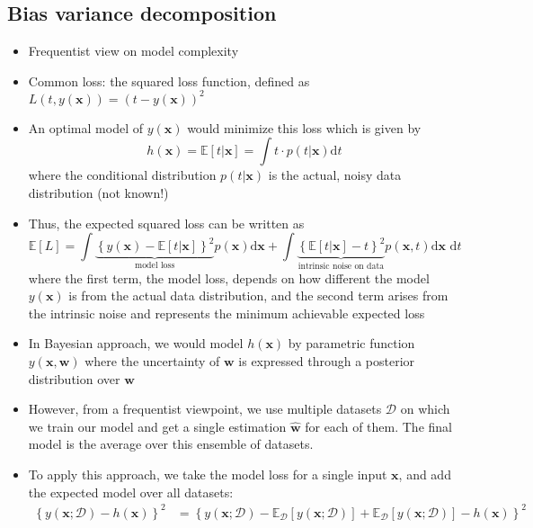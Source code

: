 \subsection{Bias variance decomposition}
\begin{itemize}
	\item Frequentist view on model complexity
	\item Common loss: the squared loss function, defined as $L\left(t, y\left(\bm{x}\right)\right) = \left(t - y\left(\bm{x}\right)\right)^2$
	\item An optimal model of $y\left(\bm{x}\right)$ would minimize this loss which is given by $$h(\bm{x}) = \mathbb{E}\left[t|\bm{x}\right] = \int t\cdot p\left(t|\bm{x}\right) \text{d}t$$
	where the conditional distribution $p\left(t|\bm{x}\right)$ is the actual, noisy data distribution (not known!)
	\item Thus, the expected squared loss can be written as
	$$\mathbb{E}\left[L\right] = \int\underbrace{\left\{y(\bm{x}) - \mathbb{E}\left[t|\bm{x}\right]\right\}^2}_{\text{model loss}} p(\bm{x}) \text{d}\bm{x} + \int\underbrace{\left\{\mathbb{E}\left[t|\bm{x}\right] - t\right\}^2}_{\text{intrinsic noise on data}} p(\bm{x},t) \text{d}\bm{x}\text{ d}t$$
	where the first term, the model loss, depends on how different the model $y(\bm{x})$ is from the actual data distribution, and the second term arises from the intrinsic noise and represents the minimum achievable expected loss
	\item In Bayesian approach, we would model $h(\bm{x})$ by parametric function $y(\bm{x}, \bm{w})$ where the uncertainty of $\bm{w}$ is expressed through a posterior distribution over $\bm{w}$
	\item However, from a frequentist viewpoint, we use multiple datasets $\mathcal{D}$ on which we train our model and get a single estimation $\bm{\hat{w}}$ for each of them. The final model is the average over this ensemble of datasets.
	\item To apply this approach, we take the model loss for a single input $\bm{x}$, and add the expected model over all datasets:
	\begin{equation*}
		\begin{split}
			\left\{y\left(\bm{x};\mathcal{D}\right) - h\left(\bm{x}\right)\right\}^2 & = \left\{y\left(\bm{x};\mathcal{D}\right) - \mathbb{E}_{\mathcal{D}}\left[y\left(\bm{x};\mathcal{D}\right)\right] + \mathbb{E}_{\mathcal{D}}\left[y\left(\bm{x};\mathcal{D}\right)\right] - h\left(\bm{x}\right)\right\}^2\\

\end{split}
\end{equation*}
\end{itemize}
